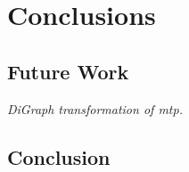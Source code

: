 \chapter{Conclusions}

\section{Future Work}

\textit{DiGraph transformation of \gls{mtp}.}

\section{Conclusion}


